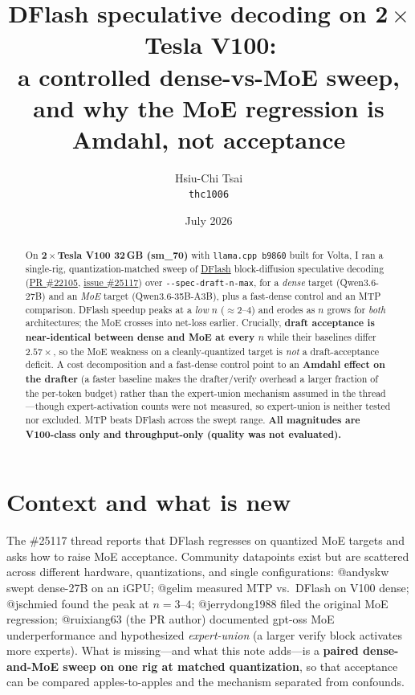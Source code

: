\documentclass[11pt]{article}
\title{\textbf{DFlash speculative decoding on 2\,$\times$\,Tesla V100:\\
a controlled dense-vs-MoE sweep, and why the MoE regression is Amdahl, not acceptance}}
\author{Hsiu-Chi Tsai \\ \texttt{thc1006}}
\date{July 2026}
\begin{document}
\maketitle

\begin{abstract}
\noindent
On \textbf{2\,$\times$\,Tesla V100 32\,GB (sm\_70)} with \texttt{llama.cpp b9860} built for Volta, I ran a single-rig,
quantization-matched sweep of \href{https://z-lab.ai/projects/dflash/}{DFlash} block-diffusion speculative decoding
(\href{https://github.com/ggml-org/llama.cpp/pull/22105}{PR \#22105}, \href{https://github.com/ggml-org/llama.cpp/issues/25117}{issue \#25117})
over \verb|--spec-draft-n-max|, for a \emph{dense} target (Qwen3.6-27B) and an \emph{MoE} target (Qwen3.6-35B-A3B), plus a fast-dense
control and an MTP comparison. DFlash speedup peaks at a \emph{low} $n$ ($\approx 2\text{--}4$) and erodes as $n$ grows for
\emph{both} architectures; the MoE crosses into net-loss earlier. Crucially, \textbf{draft acceptance is near-identical between dense
and MoE at every $n$} while their baselines differ $2.57\times$, so the MoE weakness on a cleanly-quantized target is \emph{not} a
draft-acceptance deficit. A cost decomposition and a fast-dense control point to an \textbf{Amdahl effect on the drafter} (a faster
baseline makes the drafter/verify overhead a larger fraction of the per-token budget) rather than the expert-union mechanism assumed
in the thread---though expert-activation counts were not measured, so expert-union is neither tested nor excluded. MTP beats DFlash
across the swept range. \textbf{All magnitudes are V100-class only and throughput-only (quality was not evaluated).}
\end{abstract}

\section{Context and what is new}
The \#25117 thread reports that DFlash regresses on quantized MoE targets and asks how to raise MoE acceptance. Community datapoints
exist but are scattered across different hardware, quantizations, and single configurations: @andyskw swept dense-27B on an iGPU;
@gelim measured MTP vs.\ DFlash on V100 dense; @jschmied found the peak at $n{=}3\text{--}4$; @jerrydong1988 filed the original MoE
regression; @ruixiang63 (the PR author) documented gpt-oss MoE underperformance and hypothesized \emph{expert-union} (a larger verify
block activates more experts). What is missing---and what this note adds---is a \textbf{paired dense-and-MoE sweep on one rig at
matched quantization}, so that acceptance can be compared apples-to-apples and the mechanism separated from confounds.
\end{document}
